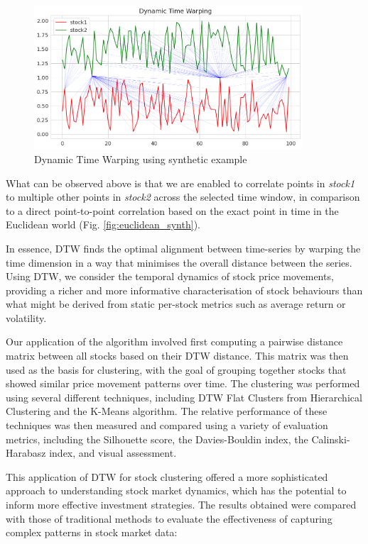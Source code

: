 \documentclass[11pt]{article}
\begin{document}
\begin{figure}[H]
\centering
\includegraphics[width=10cm]{img/dtw-sample.png} 
\caption{Dynamic Time Warping using synthetic example}

\end{figure}

What can be observed above is that we are enabled to correlate points in \textit{stock1} to multiple other points in \textit{stock2} across the selected time window, in comparison to a direct point-to-point correlation based on the exact point in time in the Euclidean world (Fig. \ref{fig:euclidean_synth}).

In essence, DTW finds the optimal alignment between time-series by warping the time dimension in a way that minimises the overall distance between the series. Using DTW, we consider the temporal dynamics of stock price movements, providing a richer and more informative characterisation of stock behaviours than what might be derived from static per-stock metrics such as average return or volatility. 

Our application of the algorithm involved first computing a pairwise distance matrix between all stocks based on their DTW distance. This matrix was then used as the basis for clustering, with the goal of grouping together stocks that showed similar price movement patterns over time. The clustering was performed using several different techniques, including DTW Flat Clusters from Hierarchical Clustering and the K-Means algorithm. The relative performance of these techniques was then measured and compared using a variety of evaluation metrics, including the Silhouette score, the Davies-Bouldin index, the Calinski-Harabasz index, and visual assessment.

This application of DTW for stock clustering offered a more sophisticated approach to understanding stock market dynamics, which has the potential to inform more effective investment strategies. The results obtained were compared with those of traditional methods to evaluate the effectiveness of capturing complex patterns in stock market data: 
\end{document}
